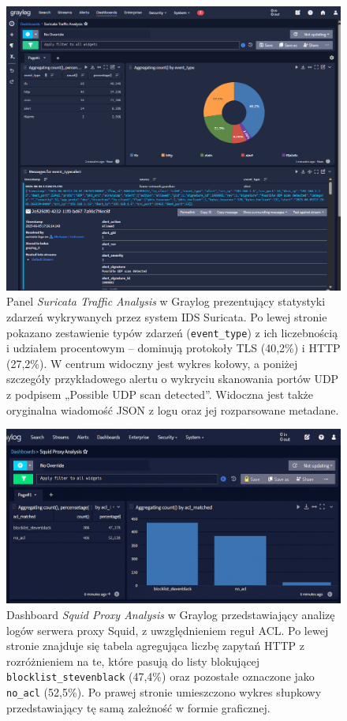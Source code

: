 \documentclass[
    left=2.5cm,         %
    right=2.5cm,        %
    top=2.5cm,          %
    bottom=3cm,         %
    bindingoffset=6mm,  %
    nohyphenation=true %
]{eiti/eiti-thesis} %
\begin{document}
\newpage
\begin{figure}[H]
    \centering
    \includegraphics[width=\textwidth]{img/graylog_alerts.png}
    \caption{Panel \textit{Suricata Traffic Analysis} w Graylog prezentujący statystyki zdarzeń wykrywanych przez system IDS Suricata. Po lewej stronie pokazano zestawienie typów zdarzeń (\texttt{event\_type}) z ich liczebnością i udziałem procentowym – dominują protokoły TLS (40,2\%) i HTTP (27,2\%). W centrum widoczny jest wykres kołowy, a poniżej szczegóły przykładowego alertu o wykryciu skanowania portów UDP z podpisem „Possible UDP scan detected”. Widoczna jest także oryginalna wiadomość JSON z logu oraz jej rozparsowane metadane.}
    \label{fig:graylog-suricata-dashboard}
\end{figure}

\newpage
\begin{figure}[H]
    \centering
    \includegraphics[width=\textwidth]{img/graylog_proxy.png}
    \caption{Dashboard \textit{Squid Proxy Analysis} w Graylog przedstawiający analizę logów serwera proxy Squid, z uwzględnieniem reguł ACL. Po lewej stronie znajduje się tabela agregująca liczbę zapytań HTTP z rozróżnieniem na te, które pasują do listy blokującej \texttt{blocklist\_stevenblack} (47{,}4\%) oraz pozostałe oznaczone jako \texttt{no\_acl} (52{,}5\%). Po prawej stronie umieszczono wykres słupkowy przedstawiający tę samą zależność w formie graficznej.}
    \label{fig:graylog-squid-logs}
\end{figure}
\end{document}
